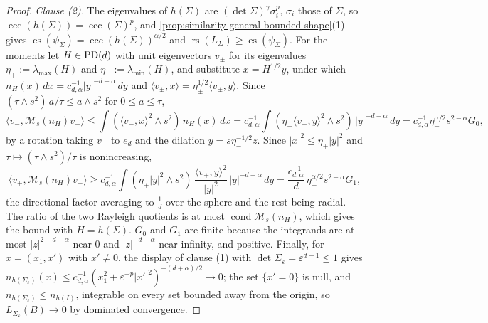 \begin{proof}
\emph{Clause (2).} The eigenvalues of $h(\Sigma)$ are $(\det\Sigma)^\gamma\sigma_i^p$, $\sigma_i$ those of $\Sigma$,
so $\operatorname{ecc}(h(\Sigma)) = \operatorname{ecc}(\Sigma)^p$, and \ref{prop:similarity-general-bounded-shape}(1) gives
$\operatorname{es}(\psi_\Sigma) = \operatorname{ecc}(h(\Sigma))^{\alpha/2}$ and $\operatorname{rs}(L_\Sigma) \ge \operatorname{es}(\psi_\Sigma)$. For the moments let
$H \in \mathrm{PD}(d)$ with unit eigenvectors $v_\pm$ for its eigenvalues $\eta_+ := \lambda_{\max}(H)$ and
$\eta_- := \lambda_{\min}(H)$, and substitute $x = H^{1/2}y$, under which
$n_H(x)\,dx = c_{d,\alpha}^{-1}|y|^{-d-\alpha}\,dy$ and $\langle v_\pm,x\rangle = \eta_\pm^{1/2}\langle v_\pm,y\rangle$.
Since $(\tau \wedge s^2)\,a/\tau \le a \wedge s^2$ for $0 \le a \le \tau$,
\[
  \langle v_-,\mathcal M_s(n_H)v_-\rangle \le \int(\langle v_-,x\rangle^2 \wedge s^2)\,n_H(x)\,dx
  = c_{d,\alpha}^{-1}\int(\eta_-\langle v_-,y\rangle^2 \wedge s^2)\,|y|^{-d-\alpha}\,dy
  = c_{d,\alpha}^{-1}\eta_-^{\alpha/2}s^{2-\alpha}G_0 ,
\]
by a rotation taking $v_-$ to $e_d$ and the dilation $y = s\eta_-^{-1/2}z$. Since $|x|^2 \le \eta_+|y|^2$ and
$\tau \mapsto (\tau \wedge s^2)/\tau$ is nonincreasing,
\[
  \langle v_+,\mathcal M_s(n_H)v_+\rangle \ge c_{d,\alpha}^{-1}\int(\eta_+|y|^2 \wedge s^2)\,\frac{\langle v_+,y\rangle^2}{|y|^2}\,|y|^{-d-\alpha}\,dy
  = \frac{c_{d,\alpha}^{-1}}{d}\,\eta_+^{\alpha/2}s^{2-\alpha}G_1 ,
\]
the directional factor averaging to $\tfrac1d$ over the sphere and the rest being radial. The ratio of the
two Rayleigh quotients is at most $\operatorname{cond}\mathcal M_s(n_H)$, which gives the bound with
$H = h(\Sigma)$. $G_0$ and $G_1$ are finite because the integrands are at most $|z|^{2-d-\alpha}$ near
$0$ and $|z|^{-d-\alpha}$ near infinity, and positive. Finally, for $x = (x_1, x')$ with $x' \ne 0$, the
display of clause (1) with $\det\Sigma_\varepsilon = \varepsilon^{d-1} \le 1$ gives
$n_{h(\Sigma_\varepsilon)}(x) \le c_{d,\alpha}^{-1}(x_1^2 + \varepsilon^{-p}|x'|^2)^{-(d+\alpha)/2} \to 0$; the set
$\{x' = 0\}$ is null, and $n_{h(\Sigma_\varepsilon)} \le n_{h(I)}$, integrable on every set bounded away from
the origin, so $L_{\Sigma_\varepsilon}(B) \to 0$ by dominated convergence.


\end{proof}
